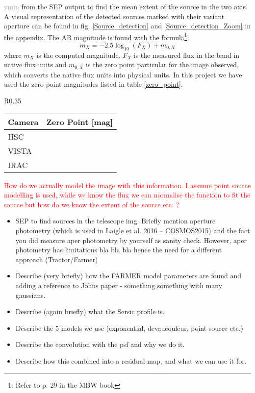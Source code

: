\textcolor{darkgray}{ymin} from the SEP output to find the mean extent of the source in the two axis. A visual representation of the detected sources marked with their variant aperture can be found in fig. \ref{Source_detection} and \ref{Source_detection_Zoom} in the appendix. The AB magnitude is found with the formula\footnote{Refer to p. 29 in the MBW book}:
\begin{equation}
    m_X = -2.5\log_{10}(F_X) + m_{0,X}
\end{equation}
where $m_X$ is the computed magnitude, $F_X$ is the measured flux in the band in native flux units and $m_{0,X}$ is the zero point particular for the image observed, which converts the native flux units into physical units. In this project we have used the zero-point magnitudes listed in table \ref{zero_point}.
\begin{wraptable}{R}{0.35\textwidth}
    \begin{tabular}{ll}
    \hline
    \textbf{Camera} & \textbf{Zero Point [mag]} \\ \hline
    HSC &  \\ \hline
    VISTA &  \\ \hline
    IRAC &  \\ \hline
    \end{tabular}
    \caption{Zero point magnitudes used for converting flux into magnitudes for various bands. \textcolor{blue}{perhaps a reference to the numbers, REMEMBER to actually write the numbers}}
    \label{zero_point}
\end{wraptable}




\textcolor{red}{How do we actually model the image with this information. I assume point source modelling is used, while we know the flux we can normalise the function to fit the source but how do we know the extent of the source etc. ?}


\begin{itemize}
    \item SEP to find sources in the telescope img. Briefly mention aperture photometry (which is used in Laigle et al. 2016 -- COSMOS2015) and the fact you did measure aper photometry by yourself as sanity check. However, aper photometry has limitations bla bla bla hence the need for a different approach (Tractor/Farmer)
    \item Describe (very briefly) how the FARMER model parameters are found and adding a reference to Johns paper - something something with many gaussians. 
    \item Describe (again briefly) what the Sersic profile is.
    \item Describe the 5 models we use (exponential, devaucouleur, point source etc.)
    \item Describe the convolution with the psf and why we do it.
    \item Describe how this combined into a residual map, and what we can use it for.
\end{itemize}

